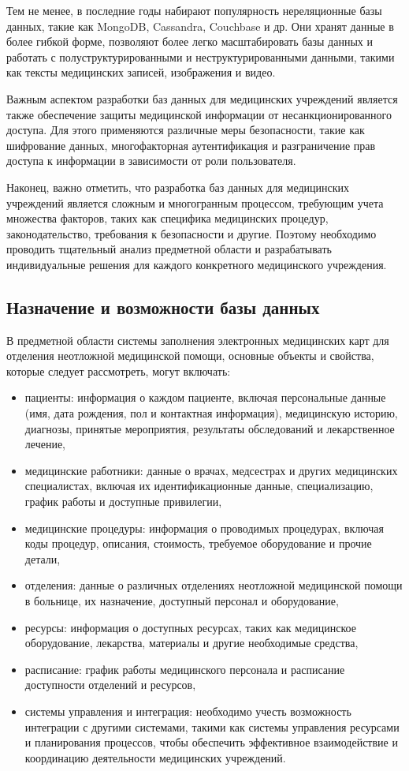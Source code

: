 Тем не менее, в последние годы набирают популярность нереляционные базы данных, такие как MongoDB, Cassandra, Couchbase и др. Они хранят данные в более гибкой форме, позволяют более легко масштабировать базы данных и работать с полуструктурированными и неструктурированными данными, такими как тексты медицинских записей, изображения и видео.

Важным аспектом разработки баз данных для медицинских учреждений является также обеспечение защиты медицинской информации от несанкционированного доступа. Для этого применяются различные меры безопасности, такие как шифрование данных, многофакторная аутентификация и разграничение прав доступа к информации в зависимости от роли пользователя.

Наконец, важно отметить, что разработка баз данных для медицинских учреждений является сложным и многогранным процессом, требующим учета множества факторов, таких как специфика медицинских процедур, законодательство, требования к безопасности и другие. Поэтому необходимо проводить тщательный анализ предметной области и разрабатывать индивидуальные решения для каждого конкретного медицинского учреждения.



\subsection{Назначение и возможности базы данных}

В предметной области системы заполнения электронных медицинских карт для отделения неотложной медицинской помощи, основные объекты и свойства, которые следует рассмотреть, могут включать:

\begin{itemize}
    \item пациенты: информация о каждом пациенте, включая персональные данные (имя, дата рождения, пол и контактная информация), медицинскую историю, диагнозы, принятые мероприятия, результаты обследований и лекарственное лечение,
    \item медицинские работники: данные о врачах, медсестрах и других медицинских специалистах, включая их идентификационные данные, специализацию, график работы и доступные привилегии,
    \item медицинские процедуры: информация о проводимых процедурах, включая коды процедур, описания, стоимость, требуемое оборудование и прочие детали,
    \item отделения: данные о различных отделениях неотложной медицинской помощи в больнице, их назначение, доступный персонал и оборудование,
    \item ресурсы: информация о доступных ресурсах, таких как медицинское оборудование, лекарства, материалы и другие необходимые средства,
    \item расписание: график работы медицинского персонала и расписание доступности отделений и ресурсов,
    \item системы управления и интеграция: необходимо учесть возможность интеграции с другими системами, такими как системы управления ресурсами и планирования процессов, чтобы обеспечить эффективное взаимодействие и координацию деятельности медицинских учреждений.
\end{itemize}

